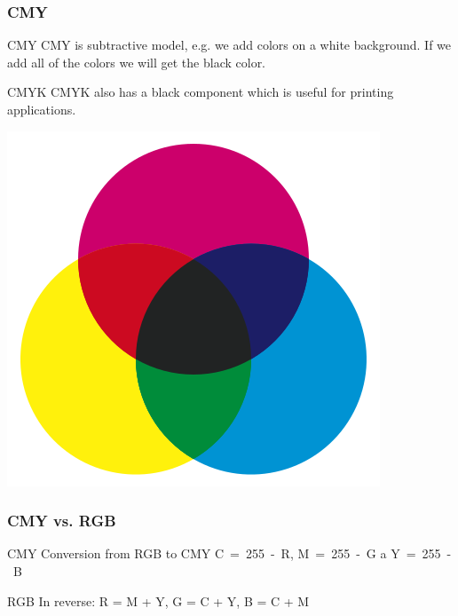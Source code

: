 \documentclass{beamer}
\begin{document}
\begin{frame}
\frametitle{CMY}
  \begin{block}{CMY}
  CMY is subtractive model, e.g. we add colors on a white background. If we add all of the colors we will get the black color.
  \end{block} 

  \begin{block}{CMYK}
  CMYK also has a black component which is useful for printing applications.
  \end{block} 

  \begin{center}
  \includegraphics[height=0.5\textheight]{CMY.png}
  \end{center}
\end{frame}

\begin{frame}
\frametitle{CMY vs. RGB}
  \begin{block}{CMY}
  Conversion from RGB to CMY C~=~255~-~R, M~=~255~-~G a Y~=~255~-~B
  \end{block} 
  
  \pause

  \begin{block}{RGB}
  In reverse: R = M + Y, G = C + Y, B = C + M
  \end{block} 
\end{frame}
\end{document}
